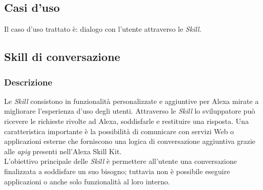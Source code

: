 	\subsection{Casi d'uso}
	Il caso d'uso trattato è: dialogo con l'utente attraverso le \emph{Skill}.
	\subsection{Skill di conversazione}
		\subsubsection{Descrizione}
		Le \emph{Skill} consistono in funzionalità personalizzate e aggiuntive per Alexa mirate a migliorare l'esperienza d'uso degli utenti. Attraverso le \emph{Skill} lo sviluppatore può ricevere le richieste rivolte ad Alexa, soddisfarle e restituire una risposta. Una caratteristica importante è la possibilità di comunicare con servizi Web o applicazioni esterne che forniscono una logica di conversazione aggiuntiva grazie alle \emph{\gls{apig}} presenti nell'Alexa Skill Kit. \\
		L'obiettivo principale delle \emph{Skill} è permettere all'utente una conversazione finalizzata a soddisfare un suo bisogno; tuttavia non è possibile eseguire applicazioni o anche solo funzionalità al loro interno.
